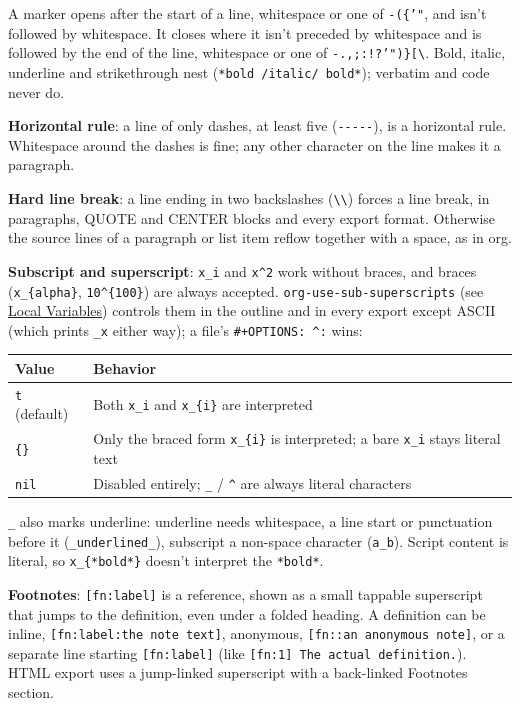 \documentclass[11pt]{article}
\begin{document}
A marker opens after the start of a line, whitespace or one of \texttt{-(\{'"}, and isn't followed by whitespace. It closes where it isn't preceded by whitespace and is followed by the end of the line, whitespace or one of \texttt{-.,;:!?'")\}[\textbackslash{}}. Bold, italic, underline and strikethrough nest (\texttt{*bold /italic/ bold*}); verbatim and code never do.

\textbf{Horizontal rule}: a line of only dashes, at least five (\texttt{-{}-{}-{}-{}-}), is a horizontal rule. Whitespace around the dashes is fine; any other character on the line makes it a paragraph.

\textbf{Hard line break}: a line ending in two backslashes (\texttt{\textbackslash{}\textbackslash{}}) forces a line break, in paragraphs, QUOTE and CENTER blocks and every export format. Otherwise the source lines of a paragraph or list item reflow together with a space, as in org.

\textbf{Subscript and superscript}: \texttt{x\_i} and \texttt{x\textasciicircum{}2} work without braces, and braces (\texttt{x\_\{alpha\}}, \texttt{10\textasciicircum{}\{100\}}) are always accepted. \texttt{org-use-sub-superscripts} (see \hyperref[sec:org761a631]{Local Variables}) controls them in the outline and in every export except ASCII (which prints \texttt{\_x} either way); a file's \texttt{\#+OPTIONS: \textasciicircum{}:} wins:

\begin{center}
\begin{tabular}{ll}
Value & Behavior\\[0pt]
\hline
\texttt{t} (default) & Both \texttt{x\_i} and \texttt{x\_\{i\}} are interpreted\\[0pt]
\texttt{\{\}} & Only the braced form \texttt{x\_\{i\}} is interpreted; a bare \texttt{x\_i} stays literal text\\[0pt]
\texttt{nil} & Disabled entirely; \texttt{\_} / \texttt{\textasciicircum{}} are always literal characters\\[0pt]
\end{tabular}
\end{center}

\texttt{\_} also marks underline: underline needs whitespace, a line start or punctuation before it (\texttt{\_underlined\_}), subscript a non-space character (\texttt{a\_b}). Script content is literal, so \texttt{x\_\{*bold*\}} doesn't interpret the \texttt{*bold*}.

\textbf{Footnotes}: \texttt{[fn:label]} is a reference, shown as a small tappable superscript that jumps to the definition, even under a folded heading. A definition can be inline, \texttt{[fn:label:the note text]}, anonymous, \texttt{[fn::an anonymous note]}, or a separate line starting \texttt{[fn:label]} (like \texttt{[fn:1] The actual definition.}). HTML export uses a jump-linked superscript with a back-linked Footnotes section.
\end{document}
